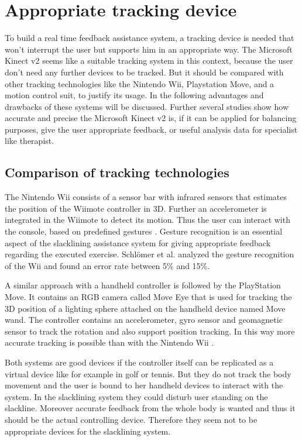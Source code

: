 \section{Appropriate tracking device}

To build a real time feedback assistance system, a tracking device is needed that won’t interrupt the user but supports him in an appropriate way. The Microsoft Kinect v2 seems like a suitable tracking system in this context, because the user don’t need any further devices to be tracked. But it should be compared with other tracking technologies like the Nintendo Wii, Playstation Move, and a motion control suit, to justify its usage. In the following advantages and drawbacks of these systems will be discussed. Further several studies show how accurate and precise the Microsoft Kinect v2 is, if it can be applied for balancing purposes, give the user appropriate feedback, or useful analysis data for specialist like therapist.

\subsection{Comparison of tracking technologies}

The Nintendo Wii consists of a sensor bar with infrared sensors that estimates the position of the Wiimote controller in 3D. Further an accelerometer is integrated in the Wiimote to detect its motion. Thus the user can interact with the console, based on predefined gestures \cite{Bogdanovych2015-ci} \cite{Tanaka2012-ACO}. Gesture recognition is an essential aspect of the slacklining assistance system for giving appropriate feedback regarding the executed exercise. Schlömer et al. \cite{Schlomer2008-uo} analyzed the gesture recognition of the Wii and found an error rate between 5\% and 15\%.

A similar approach with a handheld controller is followed by the PlayStation Move. It contains an RGB camera called Move Eye that is used for tracking the 3D position of a lighting sphere attached on the handheld device named Move wand. The controller contains an accelerometer, gyro sensor and geomagnetic sensor to track the rotation and also support position tracking. In this way more accurate tracking is possible than with the Nintendo Wii \cite{Bogdanovych2015-ci} \cite{Tanaka2012-ACO}.

Both systems are good devices if the controller itself can be replicated as a virtual device like for example in golf or tennis. But they do not track the body movement and the user is bound to her handheld devices to interact with the system. In the slacklining system they could disturb user standing on the slackline. Moreover accurate feedback from the whole body is wanted and thus it should be the actual controlling device. Therefore they seem not to be appropriate devices for the slacklining system.

